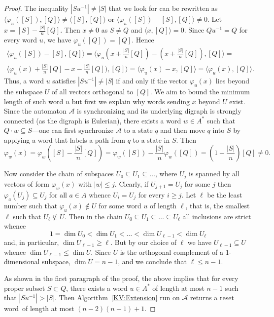 \documentclass{irmaart}
\newcommand{\sw}{reset word}
\theoremstyle{plain}
\begin{document}
\begin{proof}
The inequality $|Su^{-1}|\ne|S|$ that we look for can be rewritten as
$\langle\varphi_u([S]),[Q]\rangle\ne\langle[S],[Q]\rangle$ or
$\langle\varphi_u([S])-[S],[Q]\rangle\ne0$. Let $x=[S]-\frac{|S|}n[Q]$. Then
$x\ne0$ as $S\ne Q$ and $\langle x,[Q]\rangle=0$. Since $Qu^{-1}=Q$ for every
word $u$, we have $\varphi_u([Q])=[Q]$. Hence
\begin{multline*}
\langle\varphi_u([S])-[S],[Q]\rangle=\langle\varphi_u(x+\frac{|S|}n[Q])-(x+\frac{|S|}n[Q]),[Q]\rangle=\\
\langle\varphi_u(x)+\frac{|S|}n[Q]-x-\frac{|S|}n[Q]),[Q]\rangle=\langle\varphi_u(x)-x,[Q]\rangle=
\langle\varphi_u(x),[Q]\rangle.
\end{multline*}
Thus, a word $u$ satisfies $|Su^{-1}|\ne|S|$ if and only if the vector
$\varphi_u(x)$ lies beyond the subspace $U$ of all vectors orthogonal to $[Q]$.
We aim to bound the minimum length of such word $u$ but
first we explain why words sending $x$ beyond $U$ exist. Since the automaton $\mathcal{A}$ is
synchronizing and its underlying digraph is strongly connected (as the digraph
is Eulerian), there exists a word $w\in A^*$ such that $Q\cdot w\subseteq
S$---one can first synchronize $\mathcal{A}$ to a state $q$ and then move $q$
into $S$ by applying a word that labels a path from $q$ to a state in $S$. Then
\begin{displaymath}
\varphi_w(x)=\varphi_w([S]-\frac{|S|}n[Q])=\varphi_w([S])-\frac{|S|}n\varphi_w([Q])=
(1-\frac{|S|}n)[Q]\ne0.
\end{displaymath}

Now consider the chain of subspaces $U_0\subseteq U_1\subseteq\dotsc$, where
$U_j$ is spanned by all vectors of form $\varphi_w(x)$ with $|w|\le j$.
Clearly, if $U_{j+1}=U_j$ for some $j$ then $\varphi_a(U_j)\subseteq U_j$ for
all $a\in A$ whence $U_i=U_j$ for every $i\ge j$. Let $\ell$ be the least
number such that $\varphi_u(x)\notin U$ for some word $u$ of length $\ell$,
that is, the smallest $\ell$ such that $U_\ell\nsubseteq U$. Then in the chain
$U_0\subseteq U_1\subseteq\dots\subseteq U_\ell$ all inclusions are strict
whence
\begin{displaymath}
1=\dim U_0 < \dim U_1 <\dots<\dim U_{\ell-1}<\dim U_\ell
\end{displaymath}
and, in particular, $\dim U_{\ell-1}\ge\ell$. But by our choice of $\ell$ we
have $U_{\ell-1}\subseteq U$ whence $\dim U_{\ell-1}\le \dim U$. Since $U$ is
the orthogonal complement of a 1-dimensional subspace, $\dim U=n-1$, and we
conclude that $\ell\le n-1$.

As shown in the first paragraph of the proof, the above implies that for every
proper subset $S\subset Q$, there exists a word $u\in A^*$ of length at most
$n-1$ such that $|Su^{-1}|>|S|$. Then Algorithm~\ref{KV:Extension} run on
$\mathcal{A}$ returns a \sw\ of length at most $(n-2)(n-1)+1$.
\end{proof}
\end{document}
